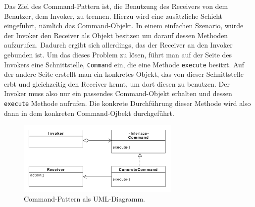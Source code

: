 Das Ziel des Command-Pattern ist, die Benutzung des Receivers von dem Benutzer, dem Invoker, zu trennen. Hierzu wird eine zusätzliche Schicht eingeführt, nämlich das Command-Objekt. In einem einfachen Szenario, würde der Invoker den Receiver als Objekt besitzen um darauf dessen Methoden aufzurufen. Dadurch ergibt sich allerdings, das der Receiver an den Invoker gebunden ist. Um das dieses Problem zu lösen, führt man auf der Seite des Invokers eine Schnittstelle, \texttt{Command} ein, die eine Methode \texttt{execute} besitzt. Auf der andere Seite erstellt man ein konkretes Objekt, das von dieser Schnittstelle erbt und gleichzeitig den Receiver kennt, um dort diesen zu benutzen. Der Invoker muss also nur ein passendes Command-Objekt erhalten und  dessen \texttt{execute} Methode aufrufen. Die konkrete Durchführung dieser Methode wird also dann in dem konkreten Command-Ojbekt durchgeführt. 


\begin{figure}[htbp]
\centering
\includegraphics[width=0.7\textwidth]{./paper/command/command}
\caption{Command-Pattern als UML-Diagramm.}
\label{commanddiagram}
\end{figure} 
